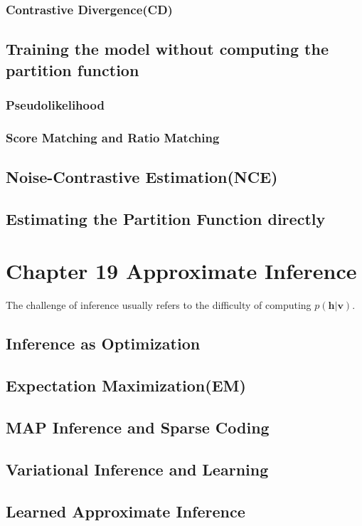 \documentclass[12pt]{article}
\numberwithin{equation}{section}
\begin{document}
\subsubsection{Contrastive Divergence(CD)}
\subsection{Training the model without computing the partition function}
\subsubsection{Pseudolikelihood}
\subsubsection{Score Matching and Ratio Matching}
\subsection{Noise-Contrastive Estimation(NCE)}
\subsection{Estimating the Partition Function directly}
\section{Chapter 19 Approximate Inference}
The challenge of inference usually refers to the difficulty of computing $p(\bm{h}|\bm{v})$.\par
\subsection{Inference as Optimization }
\subsection{Expectation Maximization(EM)}
\subsection{MAP Inference and Sparse Coding}
\subsection{Variational Inference and Learning}
\subsection{Learned Approximate Inference} 
\end{document}
